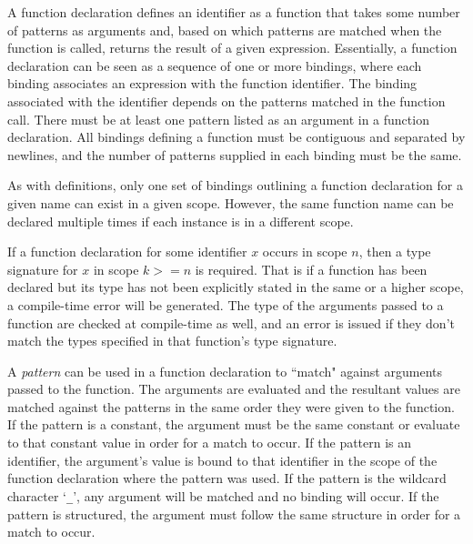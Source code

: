 A function declaration defines an identifier as a function that takes
some number of patterns as arguments and, based on which patterns are matched
when the function is called, returns the result
of a given expression. Essentially, a function declaration can be seen as a 
sequence of one or more bindings, where each binding associates
an expression with the function identifier. The binding associated with the identifier depends on the patterns matched in the function call. There must be at least one pattern listed
as an argument in a function declaration. All bindings defining
a function must be contiguous and separated by newlines, and the number of
patterns supplied in each binding must be the same.

As with definitions, only one set of bindings outlining a function declaration for a given name
can exist
in a given scope. However, the same function name can be declared multiple
times if each instance is in a different scope.

If a function declaration for some identifier $x$ occurs in scope $n$, then
a type signature for $x$ in scope $k>=n$ is required. That is if a function has
been declared but its type has not been explicitly stated in the same or a higher
scope, a compile-time error will be generated. The type of the arguments
passed to a function are checked at compile-time as well, and an error
is issued if they don't match the types specified in that function's 
type signature.

A \emph{pattern} can be used in a function declaration to ``match" against arguments passed to the function. The
arguments are evaluated and the resultant values are matched against the patterns in the same order they were given
to the function. If the pattern
is a constant, the argument must be the same constant or evaluate to that constant value in order for a match to
occur. If the pattern is an identifier, the argument's value is bound to that identifier in the scope of the
function declaration where the pattern was used. If the pattern is the wildcard character `\texttt{_}', 
any argument will be matched and no binding will occur. If the pattern is structured, the argument must follow
the same structure in order for a match to occur. 

